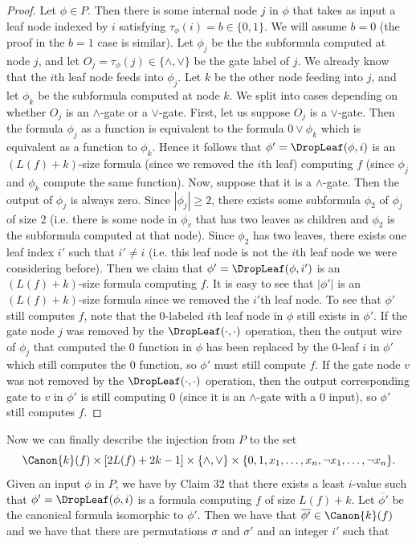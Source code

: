 \begin{proof}
Let $\phi\in P$. Then there is some internal node $j$ in $\phi$ that takes as input a leaf node indexed by $i$ satisfying $\tau_\phi(i)=b\in\{0,1\}$. We will assume $b=0$ (the proof in the $b=1$ case is similar).
Let $\phi_j$ be the the subformula computed at node $j$, and let $O_j=\tau_\phi(j)\in\{\land,\lor\}$ be the gate label of $j$. We already know that the $i$th leaf node feeds into $\phi_j$. Let $k$ be the other node feeding into $j$, and let $\phi_k$ be the subformula computed at node $k$. We split into cases depending on whether $O_j$ is an $\land$-gate or a $\lor$-gate.
First, let us suppose $O_j$ is a $\lor$-gate. Then the formula $\phi_j$ as a function is equivalent to the formula $0\lor\phi_k$ which is equivalent as a function to $\phi_k$. Hence it follows that $\phi'=\DropLeaf(\phi,i)$ is an $(L(f)+k)$-size formula (since we removed the $i$th leaf) computing $f$ (since $\phi_j$ and $\phi_k$ compute the same function).
Now, suppose that it is a $\land$-gate. Then the output of $\phi_j$ is always zero. Since $|\phi_j|\geq 2$, there exists some subformula $\phi_2$ of $\phi_j$ of size 2 (i.e. there is some node in $\phi_v$ that has two leaves as children and $\phi_2$ is the subformula computed at that node). Since $\phi_2$ has two leaves, there exists one leaf index $i'$ such that $i'\ne i$ (i.e. this leaf node is not the $i$th leaf node we were considering before).
Then we claim that $\phi'=\DropLeaf(\phi,i')$ is an $(L(f)+k)$-size formula computing $f$. It is easy to see that $|\phi'|$ is an $(L(f)+k)$-size formula since we removed the $i'$th leaf node. To see that $\phi'$ still computes $f$, note that the 0-labeled $i$th leaf node in $\phi$ still exists in $\phi'$. If the gate node $j$ was removed by the $\DropLeaf(\cdot,\cdot)$ operation, then the output wire of $\phi_j$ that computed the 0 function in $\phi$ has been replaced by the 0-leaf $i$ in $\phi'$ which still computes the 0 function, so $\phi'$ must still compute $f$. If the gate node $v$ was not removed by the $\DropLeaf(\cdot,\cdot)$ operation, then the output corresponding gate to $v$ in $\phi'$ is still computing 0 (since it is an $\land$-gate with a 0 input), so $\phi'$ still computes $f$.
\end{proof}
Now we can finally describe the injection from $P$ to the set
\[\Canon{k}(f)\times[2L(f)+2k-1]\times\{\land,\lor\}\times\{0,1,x_1,\ldots,x_n,\neg x_1,\ldots,\neg x_n\}.\]
Given an input $\phi$ in $P$, we have by Claim 32 that there exists a least $i$-value such that $\phi'=\DropLeaf(\phi,i)$ is a formula computing $f$ of size $L(f)+k$. Let $\overline{\phi'}$ be the canonical formula isomorphic to $\phi'$. Then we have that $\overline{\phi'}\in\Canon{k}(f)$ and we have that there are permutations $\sigma$ and $\sigma'$ and an integer $i'$ such that
